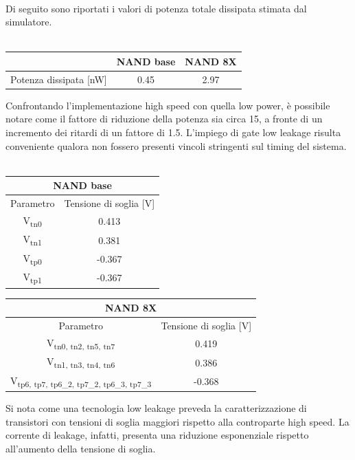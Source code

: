 \documentclass[11pt,  english, makeidx, a4paper, titlepage, oneside]{book}
\begin{document}
\\
Di seguito sono riportati i valori di potenza totale dissipata stimata dal simulatore.
\\\\
\begin{center}
	\begin{tabular}{|c|c|c|}
	\hline
	& NAND base & NAND 8X\\
	\hline
	Potenza dissipata [nW] & 0.45 & 2.97\\
	\hline
	\end{tabular}	
\end{center}
\vspace{0.3cm}
Confrontando l'implementazione high speed con quella low power, è possibile notare come il fattore di riduzione della potenza sia circa 15, a fronte di un incremento dei ritardi di un fattore di 1.5. L'impiego di gate low leakage risulta conveniente qualora non fossero presenti vincoli stringenti sul timing del sistema.
\\\\
\begin{center}
	\begin{tabular}{|c|c|}
	\hline
	 \multicolumn{2}{|c|}{NAND base} \\
	\hline
	Parametro & Tensione di soglia [V] \\
	\hline
	 V\textsubscript{tn0} & 0.413\\
	\hline
	 V\textsubscript{tn1} & 0.381 \\
	\hline
	V\textsubscript{tp0} & -0.367 \\
	\hline
	V\textsubscript{tp1} & -0.367 \\
	\hline
	\end{tabular}	
	\begin{tabular}{|c|c|}
	\hline
	 \multicolumn{2}{|c|}{NAND 8X} \\
	\hline
	Parametro & Tensione di soglia [V] \\
	\hline
	 V\textsubscript{tn0, tn2, tn5, tn7} & 0.419\\
	\hline
	 V\textsubscript{tn1, tn3, tn4, tn6} & 0.386 \\
	\hline
	V\textsubscript{tp6, tp7, tp6\_2, tp7\_2, tp6\_3, tp7\_3} & -0.368 \\
	\hline
	\end{tabular}
\end{center}
\vspace{0.3cm}
Si nota come una tecnologia low leakage preveda la caratterizzazione di transistori con tensioni di soglia maggiori rispetto alla controparte high speed. La corrente di leakage, infatti, presenta una riduzione esponenziale rispetto all'aumento della tensione di soglia.
\newpage
\end{document}
